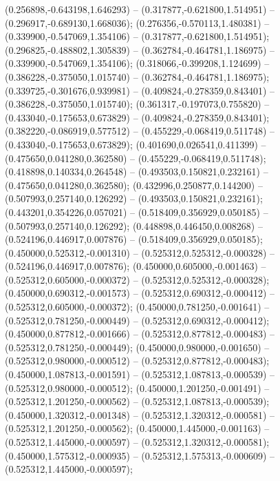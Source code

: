  (0.256898,-0.643198,1.646293) -- (0.317877,-0.621800,1.514951) -- (0.296917,-0.689130,1.668036);
 (0.276356,-0.570113,1.480381) -- (0.339900,-0.547069,1.354106) -- (0.317877,-0.621800,1.514951);
 (0.296825,-0.488802,1.305839) -- (0.362784,-0.464781,1.186975) -- (0.339900,-0.547069,1.354106);
 (0.318066,-0.399208,1.124699) -- (0.386228,-0.375050,1.015740) -- (0.362784,-0.464781,1.186975);
 (0.339725,-0.301676,0.939981) -- (0.409824,-0.278359,0.843401) -- (0.386228,-0.375050,1.015740);
 (0.361317,-0.197073,0.755820) -- (0.433040,-0.175653,0.673829) -- (0.409824,-0.278359,0.843401);
 (0.382220,-0.086919,0.577512) -- (0.455229,-0.068419,0.511748) -- (0.433040,-0.175653,0.673829);
 (0.401690,0.026541,0.411399) -- (0.475650,0.041280,0.362580) -- (0.455229,-0.068419,0.511748);
 (0.418898,0.140334,0.264548) -- (0.493503,0.150821,0.232161) -- (0.475650,0.041280,0.362580);
 (0.432996,0.250877,0.144200) -- (0.507993,0.257140,0.126292) -- (0.493503,0.150821,0.232161);
 (0.443201,0.354226,0.057021) -- (0.518409,0.356929,0.050185) -- (0.507993,0.257140,0.126292);
 (0.448898,0.446450,0.008268) -- (0.524196,0.446917,0.007876) -- (0.518409,0.356929,0.050185);
 (0.450000,0.525312,-0.001310) -- (0.525312,0.525312,-0.000328) -- (0.524196,0.446917,0.007876);
 (0.450000,0.605000,-0.001463) -- (0.525312,0.605000,-0.000372) -- (0.525312,0.525312,-0.000328);
 (0.450000,0.690312,-0.001573) -- (0.525312,0.690312,-0.000412) -- (0.525312,0.605000,-0.000372);
 (0.450000,0.781250,-0.001641) -- (0.525312,0.781250,-0.000449) -- (0.525312,0.690312,-0.000412);
 (0.450000,0.877812,-0.001666) -- (0.525312,0.877812,-0.000483) -- (0.525312,0.781250,-0.000449);
 (0.450000,0.980000,-0.001650) -- (0.525312,0.980000,-0.000512) -- (0.525312,0.877812,-0.000483);
 (0.450000,1.087813,-0.001591) -- (0.525312,1.087813,-0.000539) -- (0.525312,0.980000,-0.000512);
 (0.450000,1.201250,-0.001491) -- (0.525312,1.201250,-0.000562) -- (0.525312,1.087813,-0.000539);
 (0.450000,1.320312,-0.001348) -- (0.525312,1.320312,-0.000581) -- (0.525312,1.201250,-0.000562);
 (0.450000,1.445000,-0.001163) -- (0.525312,1.445000,-0.000597) -- (0.525312,1.320312,-0.000581);
 (0.450000,1.575312,-0.000935) -- (0.525312,1.575313,-0.000609) -- (0.525312,1.445000,-0.000597);
